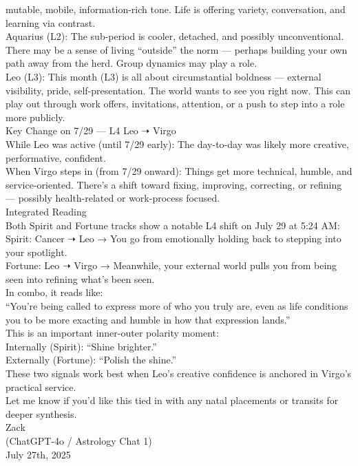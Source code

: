 \documentclass{article}
\begin{document}
mutable, mobile, information-rich tone. Life is offering variety,
conversation, and learning via contrast.\\
Aquarius (L2): The sub-period is cooler, detached, and possibly
unconventional. There may be a sense of living ``outside'' the norm ---
perhaps building your own path away from the herd. Group dynamics may
play a role.\\
Leo (L3): This month (L3) is all about circumstantial boldness ---
external visibility, pride, self-presentation. The world wants to see
you right now. This can play out through work offers, invitations,
attention, or a push to step into a role more publicly.\\
Key Change on 7/29 --- L4 Leo ➝ Virgo\\
While Leo was active (until 7/29 early): The day-to-day was likely more
creative, performative, confident.\\
When Virgo steps in (from 7/29 onward): Things get more technical,
humble, and service-oriented. There's a shift toward fixing, improving,
correcting, or refining --- possibly health-related or work-process
focused.\\
 Integrated Reading\\
Both Spirit and Fortune tracks show a notable L4 shift on July 29 at
5:24 AM:\\
Spirit: Cancer ➝ Leo → You go from emotionally holding back to stepping
into your spotlight.\\
Fortune: Leo ➝ Virgo → Meanwhile, your external world pulls you from
being seen into refining what's been seen.\\
 In combo, it reads like:\\
``You're being called to express more of who you truly are, even as life
conditions you to be more exacting and humble in how that expression
lands.''\\
This is an important inner-outer polarity moment:\\
Internally (Spirit): ``Shine brighter.''\\
Externally (Fortune): ``Polish the shine.''\\
These two signals work best when Leo's creative confidence is anchored
in Virgo's practical service.\\
Let me know if you'd like this tied in with any natal placements or
transits for deeper synthesis.\\
Zack\\
(ChatGPT-4o / Astrology Chat 1)\\
July 27th, 2025\\
\end{document}
